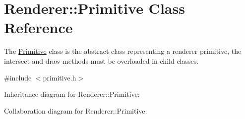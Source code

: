 \hypertarget{classRenderer_1_1Primitive}{}\section{Renderer\+:\+:Primitive Class Reference}
\label{classRenderer_1_1Primitive}


The \hyperlink{classRenderer_1_1Primitive}{Primitive} class is the abstract class representing a renderer primitive, the intersect and draw methods must be overloaded in child classes.  




{\ttfamily \#include $<$primitive.\+h$>$}



Inheritance diagram for Renderer\+:\+:Primitive\+:


Collaboration diagram for Renderer\+:\+:Primitive\+:
